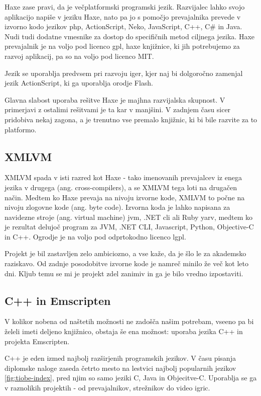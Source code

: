 Haxe\cite{haxe} zase pravi, da je večplatformski programski jezik. Razvijalec lahko svojo aplikacijo napiše v jeziku Haxe, nato pa jo s pomočjo prevajalnika prevede v izvorno kodo jezikov \gls{php}, ActionScript, Neko, JavaScript, C++, C\# in Java. Nudi tudi dodatne vmesnike za dostop do specifičnih metod ciljnega jezika. Haxe prevajalnik je na voljo pod licenco \gls{gpl}, haxe knjižnice, ki jih potrebujemo za razvoj aplikacij, pa so na voljo pod licenco MIT.

Jezik se uporablja predvsem pri razvoju iger, kjer naj bi dolgoročno zamenjal jezik ActionScript, ki ga uporablja orodje Flash.

Glavna slabost uporaba rešitve Haxe je majhna razvijalska skupnost. V primerjavi z ostalimi rešitvami je ta kar v manjšini. V zadnjem času sicer pridobiva nekaj zagona, a je trenutno vse premalo knjižnic, ki bi bile razvite za to platformo.

\subsection{XMLVM}

XMLVM\cite{xmlvm} spada v isti razred kot Haxe - tako imenovanih prevajalcev iz enega jezika v drugega (ang. cross-compilers), a se XMLVM tega loti na drugačen način. Medtem ko Haxe prevaja na nivoju izvorne kode, XMLVM to počne na nivoju zlogovne kode (ang. byte code). Izvorna koda je lahko napisana za navidezne stroje (ang. virtual machine) \gls{jvm}, .NET \gls{cli} ali Ruby \gls{yarv}, medtem ko je rezultat delujoč program za JVM, .NET CLI, Javascript, Python, Objective-C in C++. Ogrodje je na voljo pod odprtokodno licenco \gls{lgpl}.

Projekt je bil zastavljen zelo ambiciozno, a vse kaže, da je šlo le za akademsko raziskavo. Od zadnje posodobitve izvorne kode je namreč minilo že več kot leto dni. Kljub temu se mi je projekt zdel zanimiv in ga je bilo vredno izpostaviti.

\subsection{C++ in Emscripten}

V kolikor nobena od naštetih možnosti ne zadošča našim potrebam, vseeno pa bi želeli imeti deljeno knjižnico, obstaja še ena možnost: uporaba jezika C++\cite{cpp} in projekta Emscripten\cite{emscripten}.

C++ je eden izmed najbolj razširjenih programskih jezikov. V času pisanja diplomske naloge zaseda četrto mesto na lestvici najbolj popularnih jezikov \ref{fig:tiobe-index}, pred njim so samo jeziki C, Java in Objecitve-C. Uporablja se ga v raznolikih projektih - od prevajalnikov, strežnikov do video igric.


